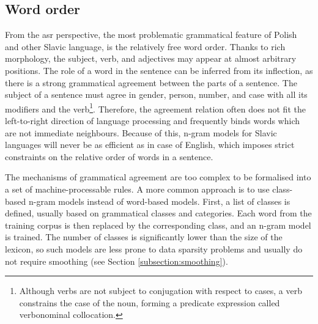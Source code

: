 \subsection{Word order}
From the \gls{asr} perspective, the most problematic grammatical feature of Polish and other Slavic language, is the relatively free word order. Thanks to rich morphology, the subject, verb, and adjectives may appear at almost arbitrary positions. The role of a word in the sentence can be inferred from its inflection, as there is a strong grammatical agreement between the parts of a sentence. The subject of a sentence must agree in gender, person, number, and case with all its modifiers and the verb\footnote{Although verbs are not subject to conjugation with respect to cases, a verb constrains the case of the noun, forming a predicate expression called verbonominal collocation\cite{vetulani2007towards}.}. Therefore, the agreement relation often does not fit the left-to-right direction of language processing and frequently binds words which are not immediate neighbours. Because of this, n-gram models for Slavic languages will never be as efficient as in case of English, which imposes strict constraints on the relative order of words in a sentence.

The mechanisms of grammatical agreement are too complex to be formalised into a set of machine-processable rules. A more common approach is to use class-based n-gram models instead of word-based models. First, a list of classes is defined, usually based on grammatical classes and categories. Each word from the training corpus is then replaced by the corresponding class, and an n-gram model is trained. The number of classes is significantly lower than the size of the lexicon, so such models are less prone to data sparsity problems and usually do not require smoothing (see Section \ref{subsection:smoothing}).

